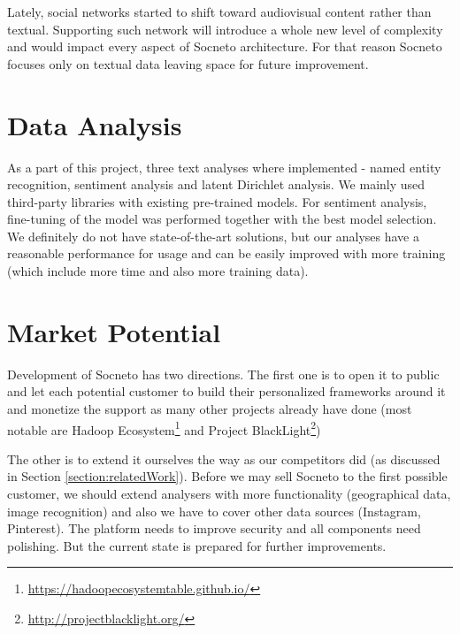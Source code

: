 Lately, social networks started to shift toward audiovisual content rather than textual. Supporting such network will introduce a whole new level of complexity and would impact every aspect of Socneto architecture. For that reason Socneto focuses only on textual data leaving space for future improvement. 

\section{Data Analysis}

As a part of this project, three text analyses where implemented - named entity recognition, sentiment analysis and latent Dirichlet analysis. We mainly used third-party libraries with existing pre-trained models. For sentiment analysis, fine-tuning of the model was performed together with the best model selection. We definitely do not have state-of-the-art solutions, but our analyses have a reasonable performance for usage and can be easily improved with more training (which include more time and also more training data).

\section{Market Potential}


Development of Socneto has two directions. The first one is to open it to public and let each potential customer to build their personalized frameworks around it and monetize the support as many other projects already have done (most notable are Hadoop Ecosystem\footnote{\url{https://hadoopecosystemtable.github.io/}} and Project BlackLight\footnote{\url{http://projectblacklight.org/}})

The other is to extend it ourselves the way as our competitors did (as discussed in Section \ref{section:relatedWork}). Before we may sell Socneto to the first possible customer, we should extend analysers with more functionality (geographical data, image recognition) and also we have to cover other data sources (Instagram, Pinterest). The platform needs to improve security and all components need polishing. But the current state is prepared for further improvements.

